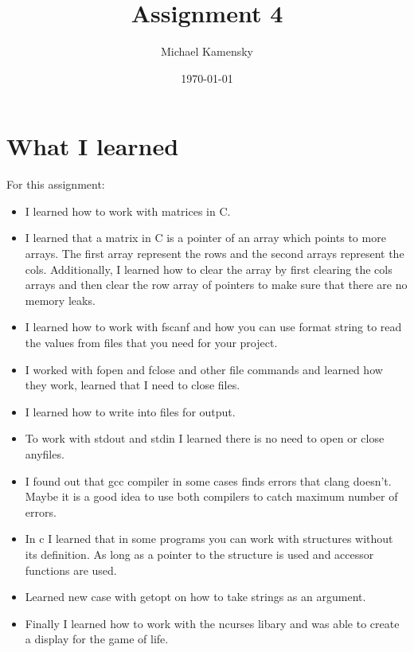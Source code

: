 \documentclass[11pt]{article} %
\title{Assignment 4}
\author{Michael Kamensky}
\date{\today} %
\begin{document}
\maketitle %
\section{What I learned}
For this assignment:
\begin{itemize}
\item I learned how to work with matrices in C.
\item I learned that a matrix in C is a pointer of an array which points to more arrays. The first array represent the rows and the second arrays represent the cols.
Additionally, I learned how to clear the array by first clearing the cols arrays and then clear the row array of pointers to make sure that there are no memory leaks.
\item I learned how to work with fscanf and how you can use format string to read the values from files that you need for your project.
\item I worked with fopen and fclose and other file commands and learned how they work, learned that I need to close files.
\item I learned how to write into files for output.
\item To work with stdout and stdin I learned there is no need to open or close anyfiles.
\item I found out that gcc compiler in some cases finds errors that clang doesn't. Maybe it is a good idea to use both compilers to catch maximum number of errors.
\item In c I learned that in some programs you can work with structures without its definition. As long as a pointer to the structure is used and accessor functions are used.
\item Learned new case with getopt on how to take strings as an argument.
\item Finally I learned how to work with the ncurses libary and was able to create a display for the game of life.
\end{itemize}
\end{document}
